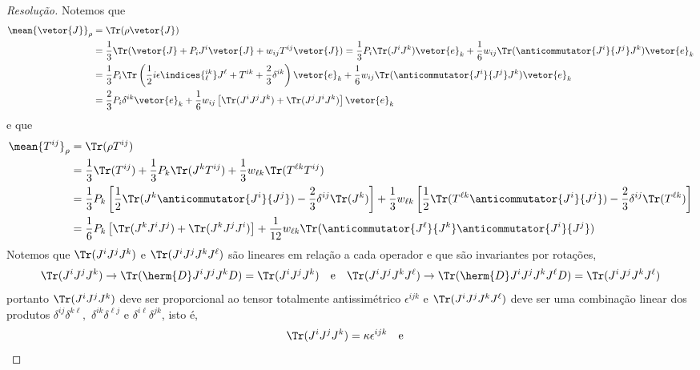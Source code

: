 \begin{proof}[Resolução]
    Notemos que
    \begin{align*}
        \mean{\vetor{J}}_\rho &= \Tr( \rho \vetor{J})\\
                              &= \frac13 \Tr(\vetor{J} + P_i J^i \vetor{J} + w_{ij} T^{ij} \vetor{J}) = \frac13 P_i \Tr(J^i J^k) \vetor{e}_k + \frac16 w_{ij} \Tr(\anticommutator{J^i}{J^j}J^k) \vetor{e}_k\\
                              &= \frac13 P_i \Tr\left(\frac12i\epsilon\indices{^{ik}_\ell}J^\ell + T^{ik} + \frac23 \delta^{ik}\right)\vetor{e}_k + \frac16 w_{ij} \Tr(\anticommutator{J^i}{J^j}J^k)\vetor{e}_k\\
                              &= \frac23 P_i \delta^{ik} \vetor{e}_k + \frac16 w_{ij} \left[\Tr(J^i J^j J^k) + \Tr(J^j J^i J^k)\right] \vetor{e}_k
    \end{align*}
    e que
    \begin{align*}
        \mean{T^{ij}}_{\rho} &= \Tr(\rho T^{ij})\\
                             &= \frac13 \Tr(T^{ij}) + \frac13 P_k \Tr(J^k T^{ij}) + \frac13 w_{\ell k} \Tr(T^{\ell k} T^{ij})\\
                             &= \frac13 P_k \left[\frac12 \Tr(J^k \anticommutator{J^i}{J^j}) - \frac23 \delta^{ij} \Tr(J^k)\right] + \frac13 w_{\ell k} \left[\frac12\Tr(T^{\ell k} \anticommutator{J^i}{J^j}) - \frac23 \delta^{ij} \Tr(T^{\ell k})\right]\\
                             &= \frac16 P_k \left[\Tr(J^k J^i J^j) + \Tr(J^k J^j J^i)\right] + \frac1{12} w_{\ell k} \Tr(\anticommutator{J^\ell}{J^k} \anticommutator{J^i}{J^j})
    \end{align*}
    Notemos que \(\Tr(J^i J^j J^k)\) e \(\Tr(J^i J^j J^k J^\ell)\) são lineares em relação a cada operador e que são invariantes por rotações,
    \begin{equation*}
        \Tr(J^i J^j J^k) \to \Tr(\herm{D} J^i J^j J^k D) = \Tr(J^i J^j J^k)\quad\text{e}\quad
        \Tr(J^i J^j J^k J^\ell) \to \Tr(\herm{D} J^i J^j J^k J^\ell D) = \Tr(J^i J^j J^k J^\ell)
    \end{equation*}
    portanto \(\Tr(J^i J^j J^k)\) deve ser proporcional ao tensor totalmente antissimétrico \(\epsilon^{ijk}\) e \(\Tr(J^i J^j J^k J^\ell)\) deve ser uma combinação linear dos produtos \(\delta^{ij} \delta^{k \ell},\) \(\delta^{i k} \delta^{\ell j}\) e \(\delta^{i \ell} \delta^{jk}\), isto é,
    \begin{equation*}
        \Tr(J^i J^j J^k) = \kappa \epsilon^{ijk}
        \quad\text{e}\quad

\end{equation*}
\end{proof}
